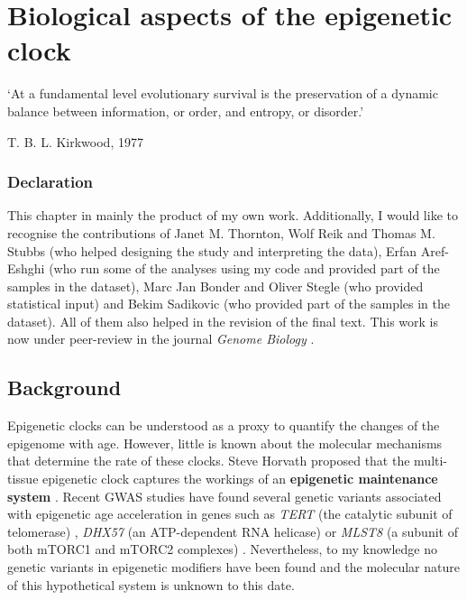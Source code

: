 
\chapter{Biological aspects of the epigenetic clock}  \label{c:3}

\ifpdf
    \graphicspath{{Chapter3/Figs/Raster/}{Chapter3/Figs/PDF/}{Chapter3/Figs/}}
\else
    \graphicspath{{Chapter3/Figs/Vector/}{Chapter3/Figs/}}
\fi



\epigraph{`At a fundamental level evolutionary survival is the preservation of a dynamic balance between information, or order, and entropy, or disorder.'}{T. B. L. Kirkwood, 1977 \cite{Kirkwood1977}}


\subsection*{Declaration} 

\footnotesize

This chapter in mainly the product of my own work. Additionally, I would like to recognise the contributions of Janet M. Thornton, Wolf Reik and Thomas M. Stubbs (who helped designing the study and interpreting the data), Erfan Aref-Eshghi (who run some of the analyses using my code and provided part of the samples in the dataset), Marc Jan Bonder and Oliver Stegle (who provided statistical input) and Bekim Sadikovic (who provided part of the samples in the dataset). All of them also helped in the revision of the final text. This work is now under peer-review in the journal \textit{Genome Biology} \cite{Martin-Herranz2019a}.

\normalsize

\section{Background} 

\smallskip

Epigenetic clocks can be understood as a proxy to quantify the changes of the epigenome with age. However, little is known about the molecular mechanisms that determine the rate of these clocks. Steve Horvath proposed that the multi-tissue epigenetic clock captures the workings of an \textbf{epigenetic maintenance system} \cite{Horvath2013}. Recent \acrshort{GWAS} studies have found several genetic variants associated with epigenetic age acceleration in genes such as \textit{TERT} (the catalytic subunit of telomerase) \cite{Lu2018}, \textit{DHX57} (an ATP-dependent RNA helicase) \cite{Lu2016} or \textit{MLST8} (a subunit of both mTORC1 and mTORC2 complexes) \cite{Lu2016}. Nevertheless, to my knowledge no genetic variants in epigenetic modifiers have been found and the molecular nature of this hypothetical system is unknown to this date.

